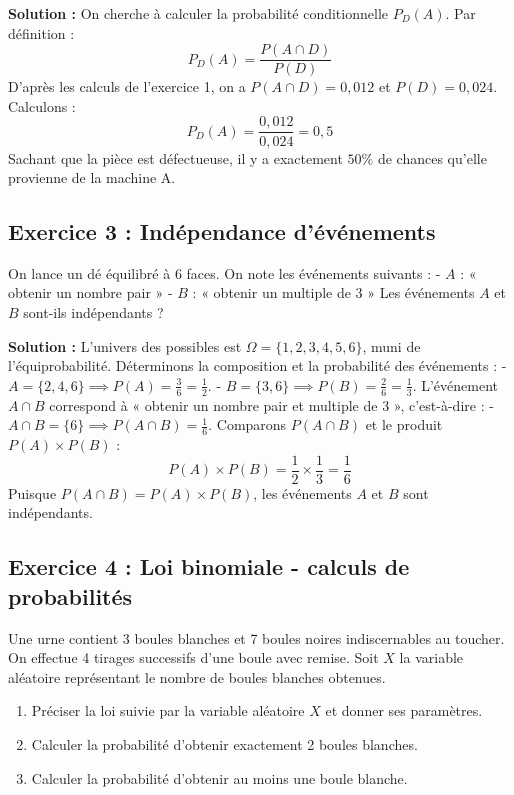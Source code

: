 \textbf{Solution :}
On cherche à calculer la probabilité conditionnelle $P_D(A)$. Par définition :
\[
P_D(A) = \frac{P(A \cap D)}{P(D)}
\]
D'après les calculs de l'exercice 1, on a $P(A \cap D) = 0,012$ et $P(D) = 0,024$.
Calculons :
\[
P_D(A) = \frac{0,012}{0,024} = 0,5
\]
Sachant que la pièce est défectueuse, il y a exactement $50\%$ de chances qu'elle provienne de la machine A.

\subsection*{Exercice 3 : Indépendance d'événements}
On lance un dé équilibré à 6 faces. On note les événements suivants :
- $A$ : « obtenir un nombre pair »
- $B$ : « obtenir un multiple de 3 »
Les événements $A$ et $B$ sont-ils indépendants ?

\textbf{Solution :}
L'univers des possibles est $\Omega = \{1, 2, 3, 4, 5, 6\}$, muni de l'équiprobabilité.
Déterminons la composition et la probabilité des événements :
- $A = \{2, 4, 6\} \implies P(A) = \frac{3}{6} = \frac{1}{2}$.
- $B = \{3, 6\} \implies P(B) = \frac{2}{6} = \frac{1}{3}$.
L'événement $A \cap B$ correspond à « obtenir un nombre pair et multiple de 3 », c'est-à-dire :
- $A \cap B = \{6\} \implies P(A \cap B) = \frac{1}{6}$.
Comparons $P(A \cap B)$ et le produit $P(A) \times P(B)$ :
\[
P(A) \times P(B) = \frac{1}{2} \times \frac{1}{3} = \frac{1}{6}
\]
Puisque $P(A \cap B) = P(A) \times P(B)$, les événements $A$ et $B$ sont indépendants.

\subsection*{Exercice 4 : Loi binomiale - calculs de probabilités}
Une urne contient 3 boules blanches et 7 boules noires indiscernables au toucher. On effectue 4 tirages successifs d'une boule avec remise. Soit $X$ la variable aléatoire représentant le nombre de boules blanches obtenues.
\begin{enumerate}
    \item Préciser la loi suivie par la variable aléatoire $X$ et donner ses paramètres.
    \item Calculer la probabilité d'obtenir exactement 2 boules blanches.
    \item Calculer la probabilité d'obtenir au moins une boule blanche.
\end{enumerate}

